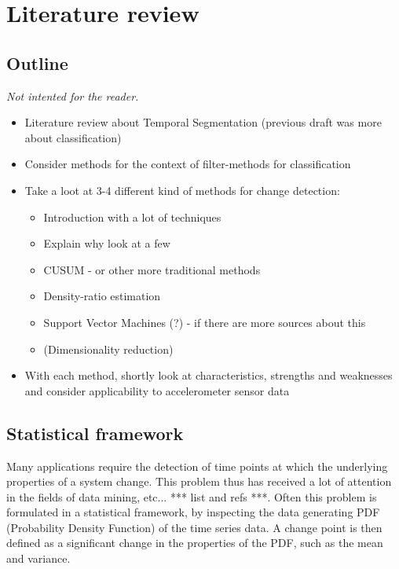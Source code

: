 
\chapter{Literature review}

\label{Chapter2} %


\section{Outline}
\emph{Not intented for the reader.}
\begin{itemize}
  \item Literature review about Temporal Segmentation (previous draft was more about classification)
  \item Consider methods for the context of filter-methods for classification
  \item Take a loot at 3-4 different kind of methods for change detection:
    \begin{itemize}
      \item Introduction with a lot of techniques
      \item Explain why look at a few
      \item CUSUM - or other more traditional methods
      \item Density-ratio estimation
      \item Support Vector Machines (?) - if there are more sources about this
      \item (Dimensionality reduction)
    \end{itemize}
  \item With each method, shortly look at characteristics, strengths and weaknesses and consider applicability to accelerometer sensor data
\end{itemize}


\section{Statistical framework}\label{statistical-framework}
Many applications require the detection of time points at which the underlying properties of a system change.
This problem thus has received a lot of attention in the fields of data mining, etc... *** list and refs ***.
Often this problem is formulated in a statistical framework, by inspecting the data generating PDF (Probability Density Function) of the time series data.
A change point is then defined as a significant change in the properties of the PDF, such as the mean and variance.

